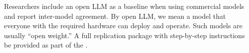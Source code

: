 Researchers \should include an open LLM as a baseline when using commercial models and report inter-model agreement. By open LLM, we mean a model that everyone with the required hardware can deploy and operate. Such models are usually ``open weight.'' A full replication package with step-by-step instructions \should be provided as part of the \supplementarymaterial.